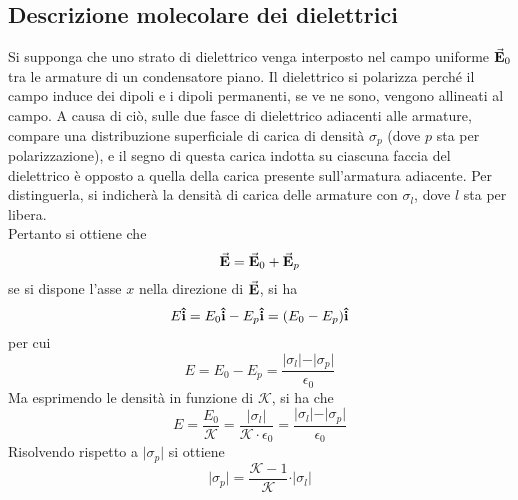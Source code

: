 \documentclass[a4paper]{extarticle}
\begin{document}
\vspace{1em}
\noindent
\subsection{Descrizione molecolare dei dielettrici}
Si supponga che uno strato di dielettrico venga interposto nel campo uniforme $\va{E}_0$ tra le armature di un condensatore piano. Il dielettrico si polarizza perché il campo induce dei dipoli e i dipoli permanenti, se ve ne sono, vengono allineati al campo. A causa di ciò, sulle due fasce di dielettrico adiacenti alle armature, compare una distribuzione superficiale di carica di densità $\sigma_p$ (dove $p$ sta per polarizzazione), e il segno di questa carica indotta su ciascuna faccia del dielettrico è opposto a quella della carica presente sull'armatura adiacente. Per distinguerla, si indicherà la densità di carica delle armature con $\sigma_l$, dove $l$ sta per libera.\\
Pertanto si ottiene che
\[\va{E} = \va{E}_0 + \va{E}_p\]
se si dispone l'asse $x$ nella direzione di $\va{E}$, si ha
\[E {\bf{\hat i}} = E_0 {\bf{\hat i}} - E_p {\bf{\hat i}} = (E_0-E_p){\bf{\hat i}}\]
per cui
\[E=E_0-E_p=\frac{\vert \sigma_l \vert-\vert \sigma_p \vert}{\epsilon_0}\]
Ma esprimendo le densità in funzione di $\mathcal{K}$, si ha che
\[E=\frac{E_0}{\mathcal{K}}=\frac{\vert \sigma_l \vert}{\mathcal{K} \cdot \epsilon_0} = \frac{\vert \sigma_l \vert-\vert \sigma_p \vert}{\epsilon_0}\]
Risolvendo rispetto a $\vert \sigma_p \vert$ si ottiene
\[\boxed{\vert \sigma_p \vert = \frac{\mathcal{K}-1}{\mathcal{K}} \cdot \vert \sigma_l \vert}\]
\end{document}
